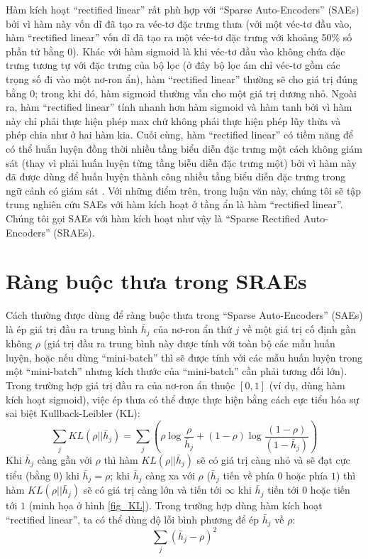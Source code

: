 Hàm kích hoạt ``rectified linear'' rất phù hợp với ``Sparse Auto-Encoders''  (SAEs) bởi vì hàm này vốn dĩ đã tạo ra véc-tơ đặc trưng thưa (với một véc-tơ đầu vào, hàm ``rectified linear'' vốn dĩ đã tạo ra một véc-tơ đặc trưng với khoảng 50\% số phần tử bằng 0). Khác với hàm sigmoid là khi véc-tơ đầu vào không chứa đặc trưng tương tự với đặc trưng của bộ lọc (ở đây bộ lọc ám chỉ véc-tơ gồm các trọng số đi vào một nơ-ron ẩn), hàm ``rectified linear'' thường sẽ cho giá trị đúng bằng 0; trong khi đó, hàm sigmoid thường vẫn cho một giá trị dương nhỏ. Ngoài ra, hàm ``rectified linear'' tính nhanh hơn hàm sigmoid và hàm tanh bởi vì hàm này chỉ phải thực hiện phép max chứ không phải thực hiện phép lũy thừa và phép chia như ở hai hàm kia. Cuối cùng, hàm ``rectified linear'' có tiềm năng để có thể huấn luyện đồng thời nhiều tầng biểu diễn đặc trưng một cách không giám sát (thay vì phải huấn luyện từng tầng biễu diễn đặc trưng một) bởi vì hàm này đã được dùng để huấn luyện thành công nhiều tầng biểu diễn đặc trưng trong ngữ cảnh có giám sát \cite{glorot2011deep}\cite{zeiler2013rectified}. Với những điểm trên, trong luận văn này, chúng tôi sẽ tập trung nghiên cứu SAEs với hàm kích hoạt ở tầng ẩn là hàm ``rectified linear''. Chúng tôi gọi SAEs với hàm kích hoạt như vậy là ``Sparse Rectified Auto-Encoders''  (SRAEs).
\section{Ràng buộc thưa trong SRAEs}
Cách thường được dùng để ràng buộc thưa trong ``Sparse Auto-Encoders''  (SAEs) là ép giá trị đầu ra trung bình $\bar{h}_j$ của nơ-ron ẩn thứ $j$ về một giá trị cố định gần không $\rho$ \cite{goodfellow2009measuring}\cite{coates2011analysis}\cite{coates2012demystifying} (giá trị đầu ra trung bình này được tính với toàn bộ các mẫu huấn luyện, hoặc nếu dùng ``mini-batch'' thì sẽ được tính với các mẫu huấn luyện trong một ``mini-batch'' nhưng kích thước của ``mini-batch'' cần phải tương đối lớn). Trong trường hợp giá trị đầu ra của nơ-ron ẩn thuộc $[0, 1]$ (ví dụ, dùng hàm kích hoạt sigmoid), việc ép thưa có thể được thực hiện bằng cách cực tiểu hóa sự sai biệt Kullback-Leibler (KL):
\begin{equation}
	\sum_jKL(\rho||\bar{h}_j) = \sum_j\left(\rho\log\frac{\rho}{\bar{h}_j} + (1-\rho)\log\frac{(1-\rho)}{(1-\bar{h}_j)}\right)
	\label{eq_lifetime_KL}
\end{equation}
Khi $\bar{h}_j$ càng gần với $\rho$ thì hàm $KL(\rho||\bar{h}_j)$ sẽ có giá trị càng nhỏ và sẽ đạt cực tiểu (bằng $0$) khi $\bar{h}_j = \rho$; khi $\bar{h}_j$ càng xa với $\rho$ ($\bar{h}_j$ tiến về phía $0$ hoặc phía $1$) thì hàm $KL(\rho||\bar{h}_j)$ sẽ có giá trị càng lớn và tiến tới $\infty$ khi $\bar{h}_j$ tiến tới $0$ hoặc tiến tới $1$ (minh họa ở hình \ref{fig_KL}). Trong trường hợp dùng hàm kích hoạt ``rectified linear'', ta có thể dùng độ lỗi bình phương để ép $\bar{h}_j$ về $\rho$:
\begin{equation}
	\sum_j(\bar{h}_j - \rho)^2
	\label{eq_lifetime_SE}
\end{equation}

